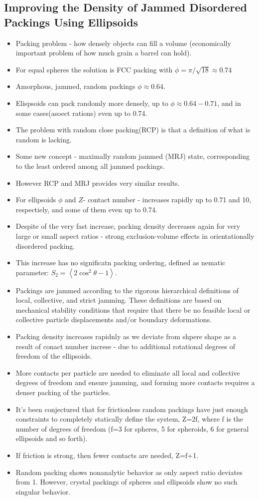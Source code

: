 \documentclass[10pt,a4paper]{article}
\begin{document}
\subsection{Improving the Density of Jammed Disordered Packings Using Ellipsoids\cite{don:04}}
\begin{itemize}
 \item Packing problem - how densely objects can fill a volume (economically important problem of how much grain a barrel can hold).
 \item For equal spheres the solution is FCC packing with $\phi = \pi/\sqrt{18} \approx 0.74$
 \item Amorphous, jammed, random packings $\phi \approx 0.64$.
 \item Elispsoids can pack randomly more densely, up to $\phi \approx 0.64-0.71$, and in some cases(asoect rations) even up to 0.74.
 \item The problem with random close packing(RCP) is that a definition of what is random is lacking. 
 \item Some new concept - maximally random jammed (MRJ) state, corresponding to the least ordered among all jammed packings.
 \item However RCP and MRJ provides very similar results.
 \item For ellipsoids $\phi$ and $Z$- contact number - increases rapidly up to 0.71 and 10, respectiely, and some of them even up to 0.74.
 \item Despite of the very fast increase, packing density decreases again for very large or small aspect ratios - strong exclusion-volume 
 effects in orientationally disordered packing.
 \item This increase has no significatn packing ordering, defined as nematic parameter: $S_2 = \left< 2\cos^2 \theta - 1 \right>$.
 \item Packings are jammed according to the rigorous hierarchical definitions of local, collective, and strict jamming.
 These definitions are based on mechanical stability conditions that require that there be no feasible local or 
 collective particle displacements and/or boundary deformations.
 \item Packing density increases rapidnly as we deviate from shpere shape as a result of conact number increse - 
 due to additional rotational degrees of freedom of the ellipsoids.
 \item More contacts per particle are needed to eliminate all local and collective degrees of freedom and ensure jamming,
 and forming more contacts requires a denser packing of the particles.
 \item It's been conjectured that for frictionless random packings have just enough constraints to completely statically define the system, Z=2f,
 where f is the number of degrees of freedom (f=3 for spheres, 5 for spheroids, 6 for general ellipsoids and so forth).
 \item If friction is strong, then fewer contacts are needed, Z=f+1.
 \item Random packing shows  nonanalytic behavior as only aspect ratio deviates from 1. 
 However, crystal packings of spheres and ellipsoids show no such singular behavior.


\end{itemize}
\end{document}
